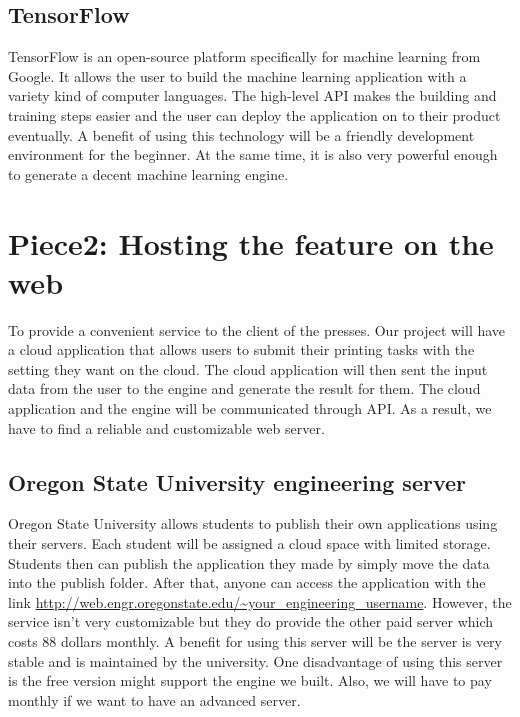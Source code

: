 \documentclass[onecolumn, draftclsnofoot,10pt, compsoc]{IEEEtran}
\begin{document}
\subsection{TensorFlow}
TensorFlow is an open-source platform specifically for machine learning from Google. It allows the user to build the machine learning application with a variety kind of computer languages. The high-level API makes the building and training steps easier and the user can deploy the application on to their product eventually.
A benefit of using this technology will be a friendly development environment for the beginner. At the same time, it is also very powerful enough to generate a decent machine learning engine.\cite{P1T3}

\section{Piece2: Hosting the feature on the web}
To provide a convenient service to the client of the presses. Our project will have a cloud application that allows users to submit their printing tasks with the setting they want on the cloud. The cloud application will then sent the input data from the user to the engine and generate the result for them. The cloud application and the engine will be communicated through API. As a result, we have to find a reliable and customizable web server.

\subsection{Oregon State University engineering server}
Oregon State University allows students to publish their own applications using their servers. Each student will be assigned a cloud space with limited storage. Students then can publish the application they made by simply move the data into the publish folder. After that, anyone can access the application with the link \url{http://web.engr.oregonstate.edu/~your_engineering_username}. However, the service isn’t very customizable but they do provide the other paid server which costs 88 dollars monthly.
A benefit for using this server will be the server is very stable and is maintained by the university. One disadvantage of using this server is the free version might support the engine we built. Also, we will have to pay monthly if we want to have an advanced server.\cite{P2T1}\cite{P2T1_2}
\end{document}

